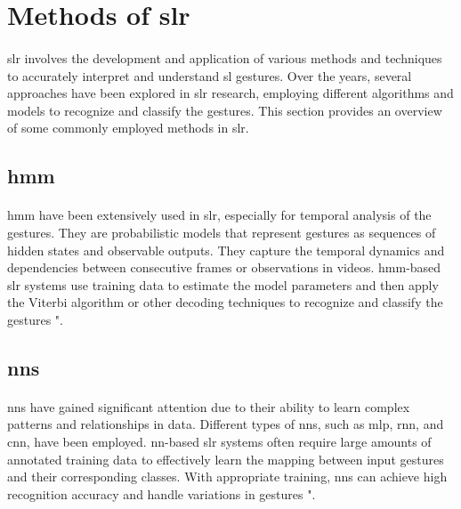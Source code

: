 \section{Methods of \ac{slr}}
\paragraph{}
\ac{slr} involves the development and application of various methods and techniques to accurately interpret and understand \ac{sl} gestures. Over the years, several approaches have been explored in \ac{slr} research, employing different algorithms and models to recognize and classify the gestures. This section provides an overview of some commonly employed methods in \ac{slr}.

\subsection{\ac{hmm}}
\paragraph{}
\ac{hmm} have been extensively used in \ac{slr}, especially for temporal analysis of the gestures. They are probabilistic models that represent gestures as sequences of hidden states and observable outputs. They capture the temporal dynamics and dependencies between consecutive frames or observations in videos. \ac{hmm}-based \ac{slr} systems use training data to estimate the model parameters and then apply the Viterbi algorithm or other decoding techniques to recognize and classify the gestures "\cite{azar2020trajectory}.

\subsection{\ac{nn}s}
\paragraph{}
\ac{nn}s have gained significant attention due to their ability to learn complex patterns and relationships in data. Different types of \ac{nn}s, such as \ac{mlp}, \ac{rnn}, and \ac{cnn}, have been employed. \ac{nn}-based \ac{slr} systems often require large amounts of annotated training data to effectively learn the mapping between input gestures and their corresponding classes. With appropriate training, \ac{nn}s can achieve high recognition accuracy and handle variations in gestures "\cite{graves2013speech}.

